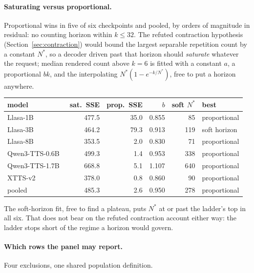 \paragraph{Saturating versus proportional.} Proportional wins in five of six checkpoints and
pooled, by orders of magnitude in residual: no counting horizon within $k\le32$. The refuted
contraction hypothesis (Section~\ref{sec:contraction}) would bound the largest separable
repetition count by a constant $N^\ast$, so a decoder driven past that horizon should
\emph{saturate} whatever the request; median rendered count above $k=6$ is fitted with a
constant $a$, a proportional $bk$, and the interpolating $N^\ast(1-e^{-k/N^\ast})$, free to put
a horizon anywhere.

\begin{center}
\begin{tabular}{lrrrrl}
\toprule
model & sat.\ SSE & prop.\ SSE & $b$ & soft $N^\ast$ & best \\
\midrule
Llasa-1B~\cite{ye2025llasa} & 477.5 & 35.0 & 0.855 & 85 & proportional \\
Llasa-3B & 464.2 & 79.3 & 0.913 & 119 & soft horizon \\
Llasa-8B & 353.5 & 2.0 & 0.830 & 71 & proportional \\
Qwen3-TTS-0.6B~\cite{hu2026qwen3tts} & 499.3 & 1.4 & 0.953 & 338 & proportional \\
Qwen3-TTS-1.7B & 668.8 & 5.1 & 1.107 & 640 & proportional \\
XTTS-v2~\cite{casanova2024xtts} & 378.0 & 0.8 & 0.860 & 90 & proportional \\
\midrule
pooled & 485.3 & 2.6 & 0.950 & 278 & proportional \\
\bottomrule
\end{tabular}
\end{center}

\noindent The soft-horizon fit, free to find a plateau, puts $N^\ast$ at or past the ladder's
top in all six. That does not bear on the refuted contraction account either way: the
ladder stops short of the regime a horizon would govern.

\paragraph{Which rows the panel may report.} Four exclusions, one shared population definition.

